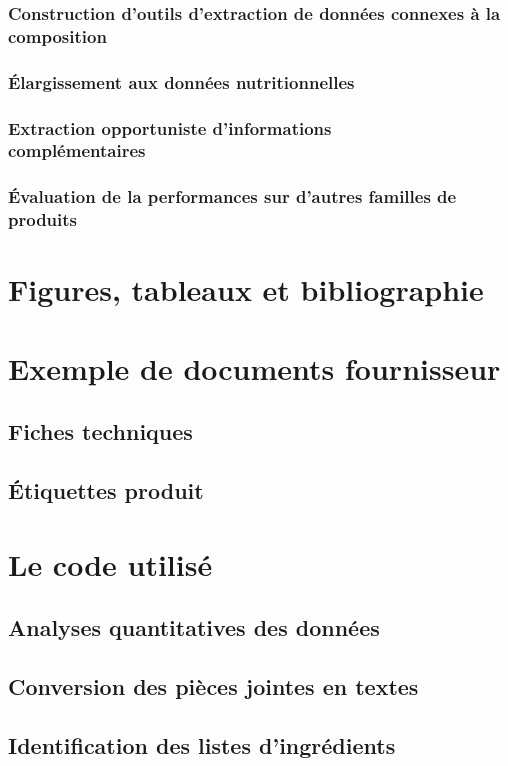 \documentclass{report}
\begin{document}
        \section{Construction d'outils d'extraction de données connexes à la composition}
        \section{\'{E}largissement aux données nutritionnelles}
        \section{Extraction \og opportuniste \fg d'informations \\ complémentaires}
        \section{\'{E}valuation de la performances sur d'autres familles de produits}


\appendix
\part{Figures, tableaux et bibliographie}
    \listoftables
    \listoffigures
    
    
\part{Exemple de documents fournisseur}
    \chapter{Fiches techniques}
    \chapter{\'{E}tiquettes produit}
\part{Le code utilisé}
    \chapter{Analyses quantitatives des données}
        \label{code:analyse_quantitative}
        
    \chapter{Conversion des pièces jointes en textes}
    \chapter{Identification des listes d'ingrédients}
\end{document}
